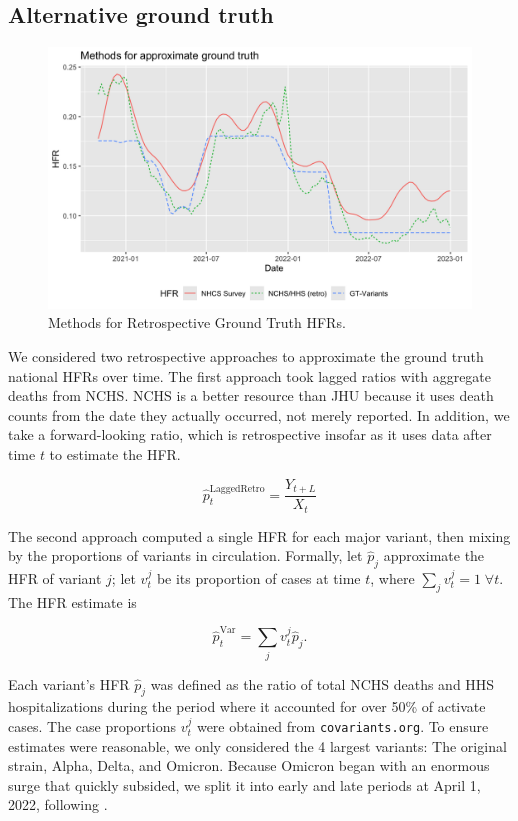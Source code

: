 \documentclass{article}
\begin{document}
\subsection{Alternative ground truth}\label{apx:alt_gt}

\begin{figure}
    \centering
    \includegraphics[width=0.8\linewidth]{Figs/ApproxGT.png}
    \caption{Methods for Retrospective Ground Truth HFRs.}
    \label{fig:approxGT}
\end{figure}

We considered two retrospective approaches to approximate the ground truth national HFRs over time. The first approach took lagged ratios with aggregate deaths from NCHS. NCHS is a better resource than JHU because it uses death counts from the date they actually occurred, not merely reported. In addition, we take a forward-looking ratio, which is retrospective insofar as it uses data after time $t$ to estimate the HFR.

\begin{equation}\label{eq:LaggedRetro}
    \hat{p}_t^{\text{LaggedRetro}} = \frac{Y_{t+L}}{X_t}
\end{equation}

The second approach computed a single HFR for each major variant, then mixing by the proportions of variants in circulation. Formally, let $\hat{p}_j$ approximate the HFR of variant $j$; let $v_t^j$ be its proportion of cases at time $t$, where $\sum_j v_t^j = 1 \; \forall t$. The HFR estimate is

$$\hat{p}_t^{\text{Var}} = \sum_j v_t^j \hat{p}_j.$$

Each variant's HFR $\hat p_j$ was defined as the ratio of total NCHS deaths and HHS hospitalizations during the period where it accounted for over 50\% of activate cases. The case proportions $v_t^j$ were obtained from \texttt{covariants.org}. To ensure estimates were reasonable, we only considered the 4 largest variants: The original strain, Alpha, Delta, and Omicron. Because Omicron began with an enormous surge that quickly subsided, we split it into early and late periods at April 1, 2022, following \citep{adjei2022mortality}.
\end{document}
